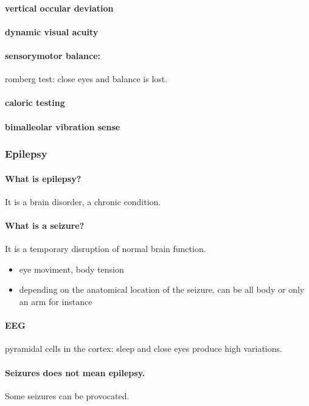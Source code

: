 \documentclass[12pt,article,oneside,a4paper]{memoir}
\begin{document}
\paragraph{vertical occular deviation}
\paragraph{dynamic visual acuity}

\paragraph{sensorymotor balance:} romberg test: close eyes and balance is lost.
\paragraph{caloric testing}
\paragraph{bimalleolar vibration sense}

\subsubsection{Epilepsy}
\paragraph{What is epilepsy?}
It is a brain disorder, a chronic condition.

\paragraph{What is a seizure?}
It is a temporary disruption of normal brain function.
\begin{itemize}
\item eye moviment, body tension
\item depending on the anatomical location of the seizure, can be all body or
only an arm for instance
\end{itemize}

\paragraph{EEG}
pyramidal cells in the cortex: sleep and close eyes produce high variations.

\paragraph{Seizures does not mean epilepsy.}
Some seizures can be provocated.
\end{document}
